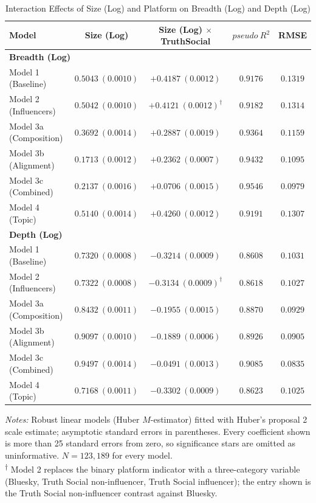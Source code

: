 \documentclass[letterpaper]{article} %
\newcommand{\rev}[1]{{\color{blue}#1}}
\begin{document}
\begin{table}[]
\centering
\caption{Interaction Effects of Size (Log) and Platform on Breadth (Log) and Depth (Log)}
\label{tab:model_comparison}
\begin{tabular}{lcccc}
\hline
\textbf{Model} & Size (Log) & Size (Log) $\times$ TruthSocial & $pseudo\ R^2$ & RMSE  \\
\hline
\hline
\multicolumn{5}{l}{\textbf{Breadth (Log)}} \\
\hline
Model 1 (Baseline) & $0.5043\ (0.0010)$ & $+0.4187\ (0.0012)$ & $0.9176$ & $0.1319$ \\
Model 2 (Influencers) & $0.5042\ (0.0010)$ & $+0.4121\ (0.0012)^{\dagger}$ & $0.9182$ & $0.1314$ \\
Model 3a (Composition) & $0.3692\ (0.0014)$ & $+0.2887\ (0.0019)$ & $0.9364$ & $0.1159$ \\
Model 3b (Alignment) & $0.1713\ (0.0012)$ & $+0.2362\ (0.0007)$ & $0.9432$ & $0.1095$ \\
Model 3c (Combined) & $0.2137\ (0.0016)$ & $+0.0706\ (0.0015)$ & $0.9546$ & $0.0979$ \\
Model 4 (Topic) & $0.5140\ (0.0014)$ & $+0.4260\ (0.0012)$ & $0.9191$ & $0.1307$ \\
\hline
\hline
\multicolumn{5}{l}{\textbf{Depth (Log)}} \\
\hline
Model 1 (Baseline) & $0.7320\ (0.0008)$ & $-0.3214\ (0.0009)$ & $0.8608$ & $0.1031$ \\
Model 2 (Influencers) & $0.7322\ (0.0008)$ & $-0.3134\ (0.0009)^{\dagger}$ & $0.8618$ & $0.1027$ \\
Model 3a (Composition) & $0.8432\ (0.0011)$ & $-0.1955\ (0.0015)$ & $0.8870$ & $0.0929$ \\
Model 3b (Alignment) & $0.9097\ (0.0010)$ & $-0.1889\ (0.0006)$ & $0.8926$ & $0.0905$ \\
Model 3c (Combined) & $0.9497\ (0.0014)$ & $-0.0491\ (0.0013)$ & $0.9085$ & $0.0835$ \\
Model 4 (Topic) & $0.7168\ (0.0011)$ & $-0.3302\ (0.0009)$ & $0.8623$ & $0.1025$ \\
\hline
\hline
\end{tabular}

\begin{minipage}{0.95\linewidth}
\footnotesize
\rev{\textit{Notes:} Robust linear models (Huber $M$-estimator) fitted with Huber's proposal 2 scale estimate; asymptotic standard errors in parentheses. Every coefficient shown is more than 25 standard errors from zero, so significance stars are omitted as uninformative. $N=123{,}189$ for every model.\\
\textsuperscript{†} Model 2 replaces the binary platform indicator with a three-category variable (Bluesky, Truth Social non-influencer, Truth Social influencer); the entry shown is the Truth Social non-influencer contrast against Bluesky.}
\end{minipage}
\end{table}
\end{document}
